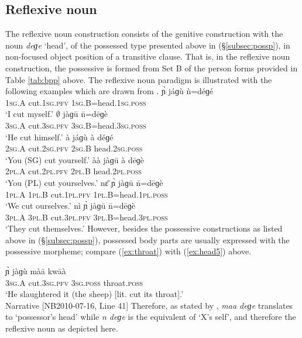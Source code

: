\documentclass[output=paper]{langscibook}
\begin{document}
\subsection{Reflexive noun}
\label{subsec:poshead}
The reflexive noun construction consists of the genitive construction with the noun \textit{deɡe} `head', of the possessed type presented above in (\S \ref{subsec:possp}), in non-focused object position of a transitive clause. That is, in the reflexive noun construction, the possessive is formed from Set B of the person forms provided in Table \ref{tab:bpp} above. The reflexive noun paradigm is illustrated with the following examples which are drawn from \cite[~442-443]{HantganHeath2018}.
\ea \label{ex:head1}
\gll ɲ̀ jáɡù ǹ=déɡé \\
1\textsc{sg}.A cut.1\textsc{sg}.\textsc{pfv} 1\textsc{sg}.B=head.1\textsc{sg}.\textsc{poss} \\
\glt `I cut myself.'
\z
\ea \label{ex:head5}
\gll $\emptyset$ jàɡū n̄=dēɡè \\
3\textsc{sg}.A cut.3\textsc{sg}.\textsc{pfv} 3\textsc{sg}.B=head.3\textsc{sg}.\textsc{poss} \\
\glt `He cut himself.'
\z
\ea \label{ex:head3}
\gll à jáɡù à déɡé \\
2\textsc{sg}.A cut.2\textsc{sg}.\textsc{pfv} 2\textsc{sg}.B head.2\textsc{sg}.\textsc{poss} \\
\glt `You (SG) cut yourself.'
\z	
\ea \label{ex:head4}
\gll àà jàɡū à dēɡè \\
2\textsc{pl}.A cut.2\textsc{pl}.\textsc{pfv} 2\textsc{pl}.B head.2\textsc{pl}.\textsc{poss} \\
\glt `You (PL) cut yourselves.'
\z	
\ea \label{ex:head2}
\gll nɛ̄ ɲ̀ jàɡū n̄=dēɡè \\
1\textsc{pl}.A 1\textsc{pl}.B cut.1\textsc{pl}.\textsc{pfv} 1\textsc{pl}.B=head.1\textsc{pl}.\textsc{poss} \\
\glt `We cut ourselves.'
\z	
\ea \label{ex:head6}
\gll nì ɲ̀ jàɡū n̄=dēɡè \\
3\textsc{pl}.A 3\textsc{pl}.B cut.3\textsc{pl}.\textsc{pfv} 3\textsc{pl}.B=head.3\textsc{pl}.\textsc{poss} \\
\glt `They cut themselves.'
\z	
However, besides the possessive constructions as listed above in (\S \ref{subsec:possp}), possessed body parts are usually expressed with the possessive morpheme; compare (\ref{ex:throat}) with (\ref{ex:head5}) above. 
\ea \label{ex:throat}

\gll 
ɲ̀ jàɡù màā kwāà \\
3\textsc{sg}.A cut.3\textsc{sg}.\textsc{pfv} 3\textsc{sg}.\textsc{poss} throat.\textsc{poss} \\
\glt `He slaughtered it (the sheep) [lit. cut its throat].'\\
Narrative [NB2010-07-16, Line 41]
\z
Therefore, as stated by \cite[442]{HantganHeath2018}, \textit{maa deɡe} translates to `possessor's head' while \textit{n deɡe} is the equivalent of `X's self', and therefore the reflexive noun as depicted here.
\end{document}
